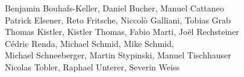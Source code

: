 %
%
%
Benjamin Bouhafs-Keller,	%
Daniel Bucher, 			%
Manuel Cattaneo%
\\
Patrick Elsener,		%
Reto Fritsche,			%
Niccolò Galliani,		%
Tobias Grab%
\\
Thomas Kistler,		%
Kistler Thomas,		%
Fabio Marti,			%
Joël Rechsteiner%
\\
Cédric Renda,			%
Michael Schmid,			%
Mike Schmid,			%
\\
Michael Schneeberger,		%
Martin Stypinski,		%
Manuel Tischhauser%
\\
Nicolas Tobler,			%
Raphael Unterer,		%
Severin Weiss%
